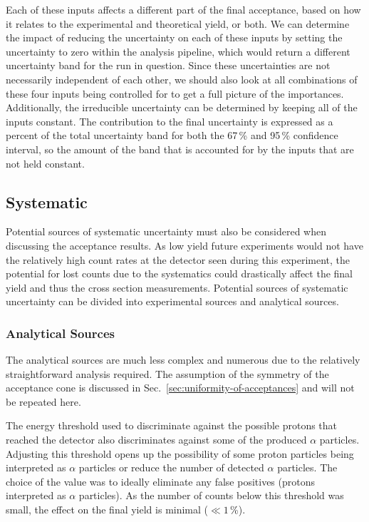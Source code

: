 Each of these inputs affects a different part of the final acceptance,
based on how it relates to the experimental and theoretical yield, or
both. We can determine the impact of reducing the uncertainty on each of
these inputs by setting the uncertainty to zero within the analysis
pipeline, which would return a different uncertainty band for the run in
question. Since these uncertainties are not necessarily independent of
each other, we should also look at all combinations of these four inputs
being controlled for to get a full picture of the importances.
Additionally, the irreducible uncertainty can be determined by keeping
all of the inputs constant. The contribution to the final uncertainty is
expressed as a percent of the total uncertainty band for both the 67\,\%
and 95\,\% confidence interval, so the amount of the band that is
accounted for by the inputs that are not held constant.

\subsection{Systematic}

Potential sources of systematic uncertainty must also be considered when
discussing the acceptance results. As low yield future experiments would
not have the relatively high count rates at the detector seen during
this experiment, the potential for lost counts due to the systematics
could drastically affect the final yield and thus the cross section
measurements. Potential sources of systematic uncertainty can be divided
into experimental sources and analytical sources.

\subsubsection{Analytical Sources}
The analytical sources are much less complex and numerous due to the
relatively straightforward analysis required. The assumption of the
symmetry of the acceptance cone is discussed in
Sec.~\ref{sec:uniformity-of-acceptances} and will not be repeated here.

The energy threshold used to discriminate against the possible protons
that reached the detector also discriminates against some of the
produced $\alpha$ particles. Adjusting this threshold opens up the
possibility of some proton particles being interpreted as $\alpha$
particles or reduce the number of detected $\alpha$ particles. The
choice of the value was to ideally eliminate any false positives
(protons interpreted as $\alpha$ particles). As the number of counts
below this threshold was small, the effect on the final yield is
minimal ($\ll 1$\,\%).

